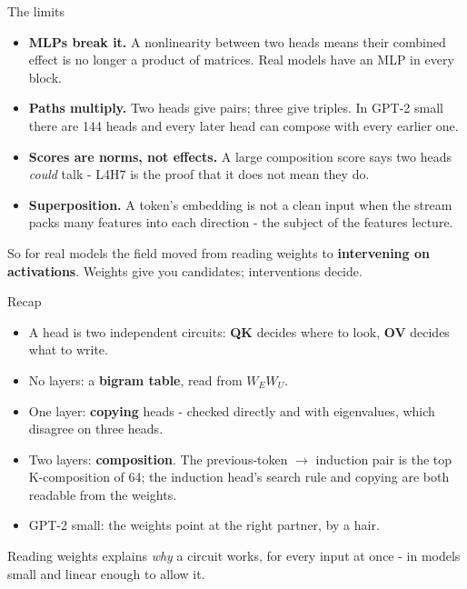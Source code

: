 \documentclass[aspectratio=169]{beamer}
\newcommand{\trapbox}[1]{%
  \begin{tcolorbox}[colback=armred!8, colframe=armred, boxrule=0.6pt, arc=2pt]
  #1
  \end{tcolorbox}}
\newcommand{\takebox}[1]{%
  \begin{tcolorbox}[colback=paramgreen!8, colframe=paramgreen, boxrule=0.6pt, arc=2pt]
  #1
  \end{tcolorbox}}
\begin{document}
\begin{frame}{The limits}
  \vspace{0.4em}
  \begin{itemize}
    \item \textbf{MLPs break it.} A nonlinearity between two heads means their combined effect is no
      longer a product of matrices. Real models have an MLP in every block.
    \item \textbf{Paths multiply.} Two heads give pairs; three give triples. In GPT-2 small there are
      144 heads and every later head can compose with every earlier one.
    \item \textbf{Scores are norms, not effects.} A large composition score says two heads
      \emph{could} talk - L4H7 is the proof that it does not mean they do.
    \item \textbf{Superposition.} A token's embedding is not a clean input when the stream packs
      many features into each direction - the subject of the features lecture.
  \end{itemize}

  \vspace{0.4em}
  \trapbox{\small So for real models the field moved from reading weights to \textbf{intervening on
  activations}. Weights give you candidates; interventions decide.}
\end{frame}

\begin{frame}{Recap}
  \vspace{0.3em}
  \begin{itemize}
    \item A head is two independent circuits: \textbf{QK} decides where to look, \textbf{OV} decides
      what to write.
    \item No layers: a \textbf{bigram table}, read from $W_E W_U$.
    \item One layer: \textbf{copying} heads - checked directly and with eigenvalues, which disagree
      on three heads.
    \item Two layers: \textbf{composition}. The previous-token $\rightarrow$ induction pair is the top
      K-composition of 64; the induction head's search rule and copying are both readable from the
      weights.
    \item GPT-2 small: the weights point at the right partner, by a hair.
  \end{itemize}

  \vspace{0.4em}
  \takebox{\small Reading weights explains \emph{why} a circuit works, for every input at once - in
  models small and linear enough to allow it.}
\end{frame}
\end{document}
